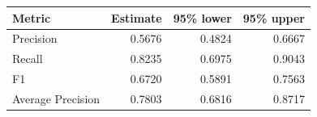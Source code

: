 \begin{tabular}{lrrr}
\toprule
Metric & Estimate & 95\% lower & 95\% upper\\
\midrule
Precision & 0.5676 & 0.4824 & 0.6667\\
Recall & 0.8235 & 0.6975 & 0.9043\\
F1 & 0.6720 & 0.5891 & 0.7563\\
Average Precision & 0.7803 & 0.6816 & 0.8717\\
\bottomrule
\end{tabular}
